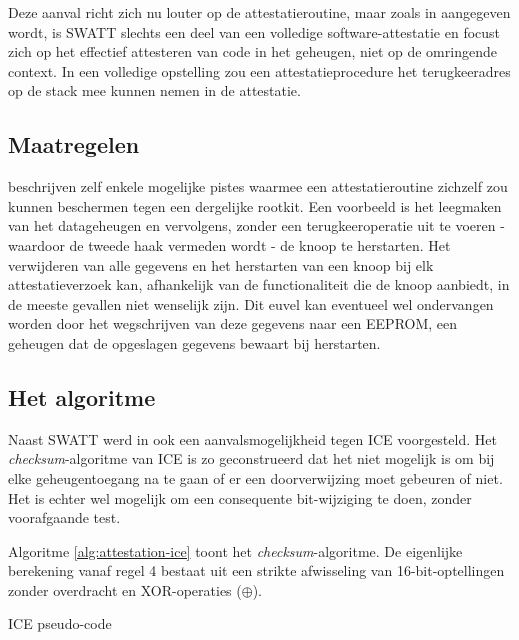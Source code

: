Deze aanval richt zich nu louter op de attestatieroutine, maar zoals in
\citep{perrig2010refutation} aangegeven wordt, is SWATT slechts een deel van
een volledige software-attestatie en focust zich op het effectief attesteren
van code in het geheugen, niet op de omringende context. In een volledige
opstelling zou een attestatieprocedure het terugkeeradres op de stack mee
kunnen nemen in de attestatie.

\subsection{Maatregelen}

\citep{castelluccia2009difficulty} beschrijven zelf enkele mogelijke pistes
waarmee een attestatieroutine zichzelf zou kunnen beschermen tegen een
dergelijke rootkit. Een voorbeeld is het leegmaken van het datageheugen en
vervolgens, zonder een terugkeeroperatie uit te voeren - waardoor de tweede
haak vermeden wordt - de knoop te herstarten. Het verwijderen van alle gegevens
en het herstarten van een knoop bij elk attestatieverzoek kan, afhankelijk van
de functionaliteit die de knoop aanbiedt, in de meeste gevallen niet wenselijk
zijn. Dit euvel kan eventueel wel ondervangen worden door het wegschrijven van
deze gegevens naar een EEPROM, een geheugen dat de opgeslagen gegevens bewaart
bij herstarten.

\subsection{Het algoritme}

Naast SWATT werd in \citep{castelluccia2009difficulty} ook een
aanvalsmogelijkheid tegen ICE voorgesteld. Het \emph{checksum}-algoritme van
ICE is zo geconstrueerd dat het niet mogelijk is om bij elke geheugentoegang na
te gaan of er een doorverwijzing moet gebeuren of niet. Het is echter wel
mogelijk om een consequente bit-wijziging te doen, zonder voorafgaande test.

Algoritme \ref{alg:attestation-ice} toont het \emph{checksum}-algoritme. De
eigenlijke berekening vanaf regel 4 bestaat uit een strikte afwisseling van
16-bit-optellingen zonder overdracht en XOR-operaties ($\oplus$).

\begin{algorithm}
\begin{algorithmic}[1]
     
     
       
      
        
  \EndFor
\end{algorithmic}
\caption{ICE pseudo-code\label{alg:attestation-ice}}
\end{algorithm}

